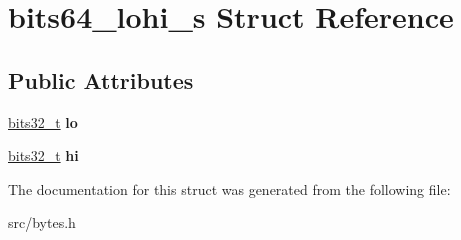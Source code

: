 \hypertarget{structbits64__lohi__s}{}\section{bits64\+\_\+lohi\+\_\+s Struct Reference}
\label{structbits64__lohi__s}
\subsection*{Public Attributes}
\begin{DoxyCompactItemize}
\item 
\hyperlink{unionbits32__t}{bits32\+\_\+t} {\bfseries lo}\hypertarget{structbits64__lohi__s_a2a6a22a377dc61c098602dd961b8c1f2}{}\label{structbits64__lohi__s_a2a6a22a377dc61c098602dd961b8c1f2}

\item 
\hyperlink{unionbits32__t}{bits32\+\_\+t} {\bfseries hi}\hypertarget{structbits64__lohi__s_adbca1ef7d341b9db5e1ab0f48ce04601}{}\label{structbits64__lohi__s_adbca1ef7d341b9db5e1ab0f48ce04601}

\end{DoxyCompactItemize}


The documentation for this struct was generated from the following file\+:\begin{DoxyCompactItemize}
\item 
src/bytes.\+h\end{DoxyCompactItemize}
